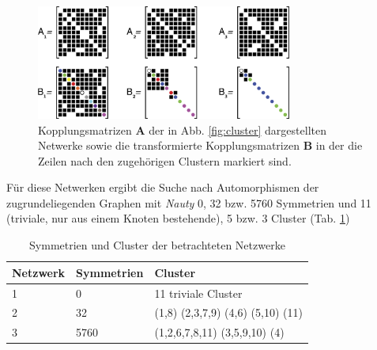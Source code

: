 \begin{figure}
	\centering
	\includegraphics[width=0.75\textwidth]{abb/misc/ABMat.png}
	\caption{Kopplungsmatrizen $\boldsymbol{A}$ der in Abb. \ref{fig:cluster} dargestellten Netwerke sowie die transformierte Kopplungsmatrizen $\boldsymbol{B}$ in der die Zeilen nach den zugehörigen Clustern markiert sind\cite{pecora2014}.}
\label{fig:abmat}
\end{figure}

Für diese Netwerken ergibt die Suche nach Automorphismen der zugrundeliegenden Graphen mit \textit{Nauty} 0, 32 bzw. 5760 Symmetrien und 11 (triviale, nur aus einem Knoten bestehende), 5 bzw. 3 Cluster (Tab. \ref{tab:netzwerke})

\begin{table}[]
	\begin{center}
	\caption{Symmetrien und Cluster der betrachteten Netzwerke}
	\label{tab:netzwerke}
\begin{tabular}{lll}
	Netzwerk & Symmetrien & Cluster                           \\
	\hline
	1        & 0          & 11 triviale Cluster               \\
	2        & 32         & (1,8) (2,3,7,9) (4,6) (5,10) (11) \\
	3        & 5760       & (1,2,6,7,8,11) (3,5,9,10) (4) \\  
	\hline
\end{tabular}
	\end{center}
\end{table}

